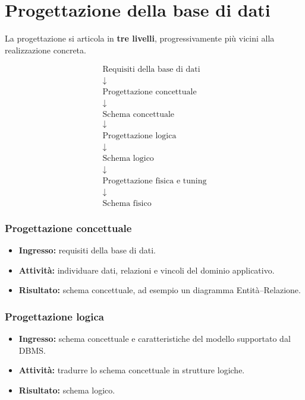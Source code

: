 \section{Progettazione della base di dati}

La progettazione si articola in \textbf{tre livelli},
progressivamente più vicini alla realizzazione concreta.

\[
\begin{gathered}
\text{Requisiti della base di dati}\\
\downarrow\\
\text{Progettazione concettuale}\\
\downarrow\\
\boxed{\text{Schema concettuale}}\\
\downarrow\\
\text{Progettazione logica}\\
\downarrow\\
\boxed{\text{Schema logico}}\\
\downarrow\\
\text{Progettazione fisica e tuning}\\
\downarrow\\
\boxed{\text{Schema fisico}}
\end{gathered}
\]

\subsubsection{Progettazione concettuale}

\begin{itemize}
    \item \textbf{Ingresso:} requisiti della base di dati.
    \item \textbf{Attività:} individuare dati, relazioni e vincoli
    del dominio applicativo.
    \item \textbf{Risultato:} schema concettuale,
    ad esempio un diagramma Entità--Relazione.
\end{itemize}

\subsubsection{Progettazione logica}

\begin{itemize}
    \item \textbf{Ingresso:} schema concettuale e caratteristiche
    del modello supportato dal DBMS.
    \item \textbf{Attività:} tradurre lo schema concettuale
    in strutture logiche.
    \item \textbf{Risultato:} schema logico.
\end{itemize}
